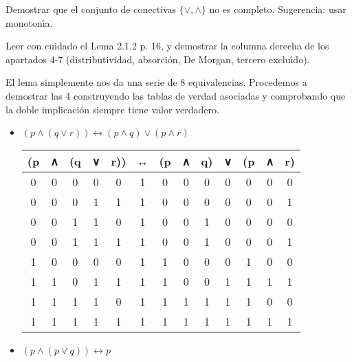 \begin{problem}[3]
Demostrar que el  conjunto de conectivas $\{\vee, \wedge\}$ no es completo.
Sugerencia: usar monoton\'{\i}a.
\solution

\end{problem}



\begin{problem}[4]
Leer con cuidado el Lema 2.1.2 p. 16, y demostrar la columna derecha de los apartados
4-7 (distributividad, absorci\'on, De Morgan, tercero exclu\'{\i}do).
\solution

El lema simplemente nos da una serie de 8 equivalencias. Procedemos a demostrar las 4 construyendo las tablas de verdad asociadas y comprobando que la doble implicación siempre tiene valor verdadero.
\begin{itemize}
\item \textbf{$(p ∧ (q ∨ r)) ↔ (p ∧ q) ∨ (p ∧ r)$}
\begin{center}
\begin{tabular}{|c|c|c|c|c|c|c|c|c|c|c|c|c|}
\hline
(p & ∧ & (q & ∨ & r)) & ↔ & (p & ∧ & q) & ∨ & (p & ∧ & r) \\
\hline
0 & 0 & 0 & 0 & 0 & 1 & 0 & 0 & 0 & 0 & 0 & 0 & 0\\
\hline
0 & 0 & 0 & 1 & 1 & 1 & 0 & 0 & 0 & 0 & 0 & 0 & 1\\
\hline
0 & 0 & 1 & 1 & 0 & 1 & 0 & 0 & 1 & 0 & 0 & 0 & 0\\
\hline
0 & 0 & 1 & 1 & 1 & 1 & 0 & 0 & 1 & 0 & 0 & 0 & 1\\
\hline
1 & 0 & 0 & 0 & 0 & 1 & 1 & 0 & 0 & 0 & 1 & 0 & 0\\
\hline
1 & 1 & 0 & 1 & 1 & 1 & 1 & 0 & 0 & 1 & 1 & 1 & 1\\
\hline
1 & 1 & 1 & 1 & 0 & 1 & 1 & 1 & 1 & 1 & 1 & 0 & 0\\
\hline
1 & 1 & 1 & 1 & 1 & 1 & 1 & 1 & 1 & 1 & 1 & 1 & 1\\
\hline
\end{tabular}
\end{center}
\item \textbf{$(p ∧ (p ∨ q)) ↔ p$}


\end{itemize}
\end{problem}
